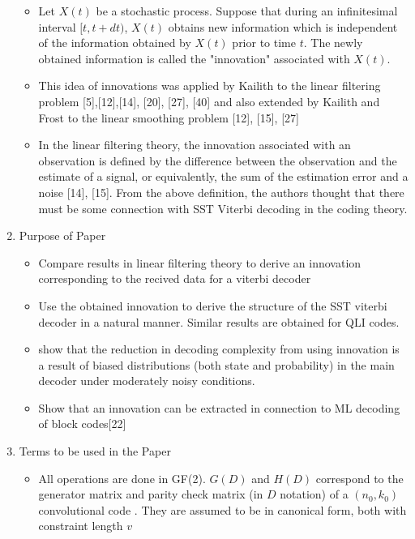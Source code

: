\documentclass[fontsize=12pt]{article}
\theoremstyle{definition}
\begin{document}
\begin{enumerate}
\begin{itemize}
\item Let $X(t)$ be a stochastic
process. Suppose that during an infinitesimal interval $[t, t +
dt)$, $X(t)$ obtains new information which is independent of
the information obtained by $X(t)$ prior to time $t$. The newly
obtained information is called the "innovation" associated
with $X(t)$.

\item This idea of innovations was applied by Kailith to the linear filtering problem [5],[12],[14], [20], [27], [40] and also extended by Kailith and Frost to the linear smoothing problem [12], [15], [27]

\item In the linear filtering
theory, the innovation associated with an observation is defined
by the difference between the observation and the estimate of a signal, or equivalently, the sum of the estimation error and a
noise [14], [15]. From the above definition, the authors thought that there must be some connection with SST Viterbi decoding in the coding theory.
\end{itemize}


\item {Purpose of Paper}
\begin{itemize}
\item Compare results in linear filtering theory to derive an innovation corresponding to the recived data for a viterbi decoder 

\item Use the obtained innovation to derive the structure of the SST viterbi decoder in a natural manner. Similar results are obtained for QLI codes.

\item show that the reduction in decoding complexity from using innovation is a result of biased distributions (both state and probability) in the main decoder under moderately noisy conditions.

\item Show that an innovation can be extracted in connection to ML decoding of block codes[22]
\end{itemize}

\item {Terms to be used in the Paper}
\begin{itemize}
\item All operations are done in GF(2). $G(D)$ and $H(D)$ correspond to the generator matrix and parity check matrix (in $D$ notation) of a $(n_0,k_0)$ convolutional code . They are assumed to be in canonical form, both with constraint length $v$


\end{itemize}
\end{enumerate}
\end{document}

